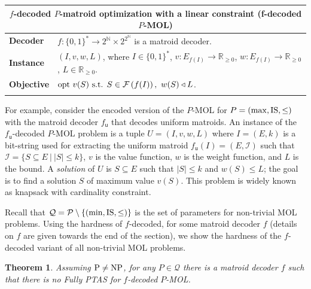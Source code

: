 \documentclass[11pt,letter]{article}
\newcommand{\opt}{\textnormal{opt}}
\newcommand{\IS}{\textnormal{IS}}
\newcommand{\cQ}{{\mathcal{Q}}}
\newcommand{\cI}{{\mathcal{I}}}
\newcommand{\cm}{{\mathcal{M}}}
\newcommand{\cF}{{\mathcal{F}}}
\newcommand{\cP}{{\mathcal{P}}}
\newcommand{\problem}[2]{
	\noindent
	\begin{tabular}{ p{0.8in} p{5.4in} }
		\\
		\hline
		\multicolumn{2}{c}{#1} \\
		\hline
		#2\\
		\hline
		\\
	\end{tabular}
}
\newtheorem{theorem}[lemma]{Theorem}
\begin{document}
		\problem{ {\sc $f$-decoded $P$-matroid optimization with a linear constraint} (f-decoded $P$-MOL)}{
		{\bf Decoder} & $f:\{0,1\}^* \rightarrow 2^\mathbb{N} \times 2^{2^{\mathbb{N}}}$ is a matroid decoder.\\
		{\bf Instance} &   $(I,v,w,L)$, where $I \in \{0,1\}^*$,  $v:E_{f(I)} \rightarrow \mathbb{R}_{\geq 0}$, $w:E_{f(I)} \rightarrow\mathbb{R}_{\geq 0}$, $L \in \mathbb{R}_{\geq 0}$. \\
		{\bf Objective} & $\opt~ v(S) \text{ s.t. } S \in \cF\left(f(I)\right),~  w(S) \triangleleft L$.
	}
	
	For example, consider the encoded version of the %
	$P$-MOL for $P = (\max,\IS,\leq)$ with the matroid decoder $f_{\textsf{u}}$ that decodes uniform matroids. %
	An instance of the $f_{\textsf{u}}$-decoded $P$-MOL problem is a tuple $U = (I,v,w,L)$ where $I = (E,k)$ is a bit-string used for extracting the uniform matroid $f_{\textsf{u}}(I) = (E,\cI)$ such that $\cI = \{S \subseteq E~|~|S| \leq k\}$, $v$ is the value function, $w$ is the weight function, and $L$ is the bound. %
	A {\em solution} of $U$ is $S \subseteq E$ such that $|S| \leq k$ and $w(S) \leq L$; the goal is to find a solution $S$ of maximum value $v(S)$. This problem is widely known as {\sc knapsack with cardinality constraint}.  
	
	Recall that $\cQ = \cP \setminus \{(\min,\IS,\leq)\}$ is the set of parameters for non-trivial MOL problems. Using the hardness of $f$-decoded, for some matroid decoder $f$ (details on $f$ are given towards the end of the section), we show the hardness of the $f$-decoded  variant of all non-trivial MOL problems.
	
	

	 \begin{theorem}
	 	\label{thm:mainA}
	 	Assuming $\textnormal{P} \neq \textnormal{NP}$, for any $P \in \cQ$ there is a matroid decoder $f$ such that there is no \textnormal{Fully PTAS} for $f$-\textnormal{decoded} $P$-\textnormal{MOL}. 
	 \end{theorem}
	 
\end{document}
